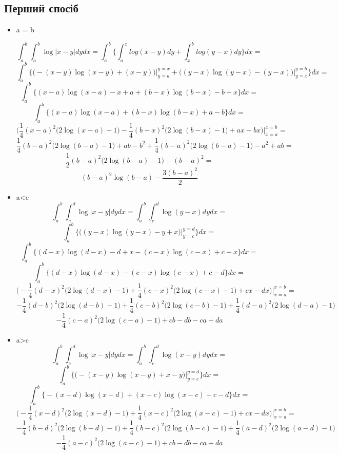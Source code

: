 \documentclass[12pt]{report}
\begin{document}
	\subsection{Перший спосіб}
		\begin{itemize}
			\item a = b
			
			$$\int_{a}^{b}\int_{a}^{b}\log\big| x-y \big|dydx=\int_{a}^{b}\Bigg\{\int_{a}^{x}log(x-y)dy+\int_{x}^{b}log(y-x)dy\Bigg\}dx =$$ $$\int_{a}^{b}\Bigg\{\big(-(x-y)\log(x-y)+(x-y)\big)\Big|_{y=a}^{y=x}+\big((y-x)\log(y-x)-(y-x)\big)\Big|_{y=x}^{y=b} \Bigg\}dx = $$
			$$\int_{a}^{b}\Bigg\{(x-a)\log(x-a)-x+a+(b-x)\log(b-x)-b+x\Bigg\}dx=$$
			$$\int_{a}^{b}\Bigg\{(x-a)\log(x-a)+(b-x)\log(b-x)+a-b\Bigg\}dx=$$
			$$\Bigg(\frac{1}{4}(x-a)^2\big(2\log(x-a)-1\big)-\frac{1}{4}(b-x)^2\big(2\log(b-x)-1\big)+ax-bx\Bigg)\Big|_{x=a}^{x=b}=$$
			$$\frac{1}{4}(b-a)^2\big(2\log(b-a)-1\big)+ab-b^2+\frac{1}{4}(b-a)^2\big(2\log(b-a)-1\big)-a^2+ab=$$
			$$\frac{1}{2}(b-a)^2\big(2\log(b-a)-1\big)-(b-a)^2=$$
			$$(b-a)^2\log(b-a)-\frac{3(b-a)^2}{2}$$
		
			\item a<c
			$$\int_{a}^{b}\int_{c}^{d}\log\big| x-y \big| dydx=\int_{a}^{b}\int_{c}^{d}\log(y-x)dydx=$$
			$$\int_{a}^{b}\Bigg\{\big((y-x)\log(y-x)-y+x\big)\Bigg|_{y=c}^{y=d}\Bigg\}dx=$$
			$$\int_{a}^{b}\Bigg\{(d-x)\log(d-x)-d+x-(c-x)\log(c-x)+c-x\Bigg\}dx=$$
			$$\int_{a}^{b}\Bigg\{(d-x)\log(d-x)-(c-x)\log(c-x)+c-d\Bigg\}dx=$$
			$$\Bigg(-\frac{1}{4}(d-x)^2\big(2\log(d-x)-1\big)+\frac{1}{4}(c-x)^2\big(2\log(c-x)-1\big)+cx-dx\Bigg)\Bigg|_{x=a}^{x=b}=$$
			$$-\frac{1}{4}(d-b)^2\big(2\log(d-b)-1\big)+\frac{1}{4}(c-b)^2\big(2\log(c-b)-1\big)+\frac{1}{4}(d-a)^2\big(2\log(d-a)-1\big)$$$$-\frac{1}{4}(c-a)^2\big(2\log(c-a)-1\big)+cb-db-ca+da$$
			\item a>c
			$$\int_{a}^{b}\int_{c}^{d}\log\big| x-y \big|dydx=\int_{a}^{b}\int_{c}^{d}\log(x-y)dydx=$$
			$$\int_{a}^{b}\Bigg\{\big(-(x-y)\log(x-y)+x-y\big)\Bigg|_{y=c}^{y=d}\Bigg\}dx=$$
			$$\int_{a}^{b}\Bigg\{-(x-d)\log(x-d)+(x-c)\log(x-c)+c-d\Bigg\}dx=$$
			$$\Bigg(-\frac{1}{4}(x-d)^2\big(2\log(x-d)-1\big)+\frac{1}{4}(x-c)^2\big(2\log(x-c)-1\big)+cx-dx\Bigg)\Bigg|_{x=a}^{x=b}=$$
			$$-\frac{1}{4}(b-d)^2\big(2\log(b-d)-1\big)+\frac{1}{4}(b-c)^2\big(2\log(b-c)-1\big)+\frac{1}{4}(a-d)^2\big(2\log(a-d)-1\big)$$$$-\frac{1}{4}(a-c)^2\big(2\log(a-c)-1\big)+cb-db-ca+da$$
		\end{itemize}
\end{document}
